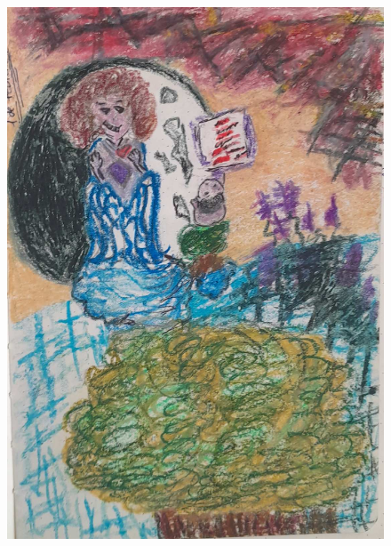 \documentclass[12pt, a4paper, twoside]{book} %
\begin{document}
\begin{figure}[H]
	\centering
	\includegraphics[width=\textwidth]{./images/1f81324dd8aaa9.jpg}
\end{figure}
\end{document}
